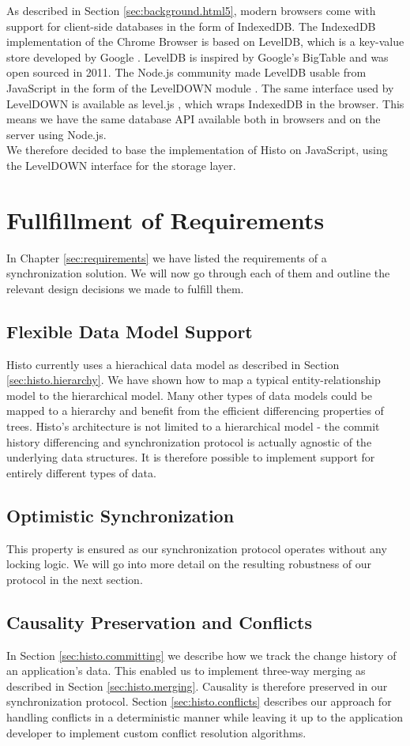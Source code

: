As described in Section \ref{sec:background.html5}, modern browsers come with support for client-side databases in the form of IndexedDB.
The IndexedDB implementation of the Chrome Browser is based on LevelDB, which is a key-value store developed by Google \cite{leveldb}.
LevelDB is inspired by Google's BigTable \cite{chang2008bigtable} and was open sourced in 2011.
The Node.js community made LevelDB usable from JavaScript in the form of the LevelDOWN module \cite{leveldown}.
The same interface used by LevelDOWN is available as level.js \cite{leveljs}, which wraps IndexedDB in the browser.
This means we have the same database API available both in browsers and on the server using Node.js.\\
We therefore decided to base the implementation of Histo on JavaScript, using the LevelDOWN interface for the storage layer.

\section{Fullfillment of Requirements}
In Chapter \ref{sec:requirements} we have listed the requirements of a synchronization solution.
We will now go through each of them and outline the relevant design decisions we made to fulfill them.

\subsection*{Flexible Data Model Support}
Histo currently uses a hierachical data model as described in Section \ref{sec:histo.hierarchy}.
We have shown how to map a typical entity-relationship model to the hierarchical model.
Many other types of data models could be mapped to a hierarchy and benefit from the efficient differencing properties of trees.
Histo's architecture is not limited to a hierarchical model - the commit history differencing and synchronization protocol is actually agnostic of the underlying data structures.
It is therefore possible to implement support for entirely different types of data.

\subsection*{Optimistic Synchronization}
This property is ensured as our synchronization protocol operates without any locking logic.
We will go into more detail on the resulting robustness of our protocol in the next section.

\subsection*{Causality Preservation and Conflicts}
In Section \ref{sec:histo.committing} we describe how we track the change history of an application's data.
This enabled us to implement three-way merging as described in Section \ref{sec:histo.merging}.
Causality is therefore preserved in our synchronization protocol.
Section \ref{sec:histo.conflicts} describes our approach for handling conflicts in a deterministic manner while leaving it up to the application developer to implement custom conflict resolution algorithms.

